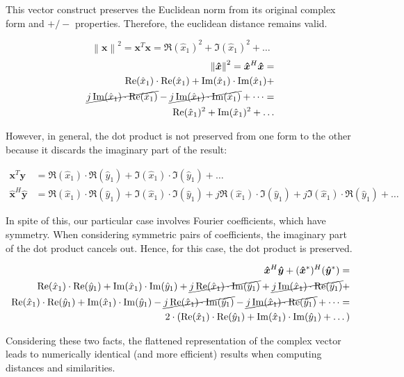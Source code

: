 \documentclass[../main.tex]{subfiles}
\begin{document}
This vector construct preserves the Euclidean norm from its original complex form and $+/-$ properties. Therefore, the euclidean distance remains valid.

\begin{equation}
    \left\lVert \bm{x} \right\rVert^2 = \bm{x}^T\bm{x} = \Re(\hat{x}_1)^2 + \Im(\hat{x}_1)^2 + \dots
\end{equation}
\begin{equation}
\begin{split}
    \left\lVert \bm{\hat{x}} \right\rVert^2 = \bm{\hat{x}}^H\bm{\hat{x}} =\\
    \Re(\hat{x}_1) \cdot \Re(\hat{x}_1) + \Im(\hat{x}_1) \cdot \Im(\hat{x}_1) +\\
    \cancel{j\Im(\hat{x}_1) \cdot \Re(\hat{x}_1)} - \cancel{j\Im(\hat{x}_1) \cdot \Im(\hat{x}_1)} + \dots =\\ \Re(\hat{x}_1)^2 + \Im(\hat{x}_1)^2 + \dots
\end{split}
\end{equation}

However, in general, the dot product is not preserved from one form to the other because it discards the imaginary part of the result:

\begin{align}
    \bm{x}^T\bm{y} &= \Re(\hat{x}_1) \cdot \Re(\hat{y}_1) + \Im(\hat{x}_1) \cdot \Im(\hat{y}_1) + \dots\\
    \bm{\hat{x}}^H\bm{\hat{y}} &= \Re(\hat{x}_1) \cdot \Re(\hat{y}_1) + \Im(\hat{x}_1) \cdot \Im(\hat{y}_1) + j \Re(\hat{x}_1) \cdot \Im(\hat{y}_1) + j\Im(\hat{x}_1) \cdot \Re(\hat{y}_1) + \dots
\end{align}

In spite of this, our particular case involves Fourier coefficients, which have symmetry. When considering symmetric pairs of coefficients, the imaginary part of the dot product cancels out. Hence, for this case, the dot product is preserved.

\begin{equation}
\begin{split}
    \bm{\hat{x}}^H\bm{\hat{y}} + (\bm{\hat{x}}^*)^H(\bm{\hat{y}}^*) =\\
    \Re(\hat{x}_1) \cdot \Re(\hat{y}_1) + \Im(\hat{x}_1) \cdot \Im(\hat{y}_1) + \cancel{j \Re(\hat{x}_1) \cdot \Im(\hat{y}_1)} + \cancel{j\Im(\hat{x}_1) \cdot \Re(\hat{y}_1)} +\\ 
    \Re(\hat{x}_1) \cdot \Re(\hat{y}_1) + \Im(\hat{x}_1) \cdot \Im(\hat{y}_1) - \cancel{j \Re(\hat{x}_1) \cdot \Im(\hat{y}_1)} - \cancel{j\Im(\hat{x}_1) \cdot \Re(\hat{y}_1)} + \dots =\\ 
    2 \cdot (\Re(\hat{x}_1) \cdot \Re(\hat{y}_1) + \Im(\hat{x}_1) \cdot \Im(\hat{y}_1) + \dots)
\end{split}
\end{equation}

Considering these two facts, the flattened representation of the complex vector leads to numerically identical (and more efficient) results when computing distances and similarities.
\end{document}

